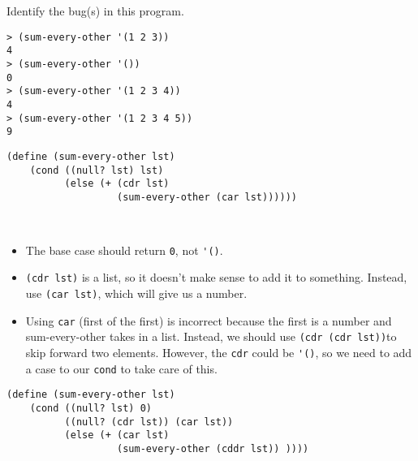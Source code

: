 \begin{blocksection}
\question Identify the bug(s) in this program.

\begin{lstlisting}
> (sum-every-other '(1 2 3))
4
> (sum-every-other '())
0
> (sum-every-other '(1 2 3 4))
4
> (sum-every-other '(1 2 3 4 5))
9
\end{lstlisting}

\begin{lstlisting}
(define (sum-every-other lst)
    (cond ((null? lst) lst)
          (else (+ (cdr lst)
                   (sum-every-other (car lst))))))
                   
 
\end{lstlisting}

\begin{solution}
\begin{itemize}
\item The base case should return \lstinline$0$, not \lstinline$'()$.
\item \lstinline$(cdr lst)$ is a list, so it doesn't make sense to add it to something. 
Instead, use \lstinline$(car lst)$, which will give us a number.
\item Using \lstinline$car$ (first of the first) is incorrect because the first is a
number and sum-every-other takes in a list. Instead, we should use
\lstinline$(cdr (cdr lst))$to skip forward two elements. However, the
\lstinline$cdr$ could be \lstinline$'()$, so we need to add a case to our \lstinline$cond$
to take care of this.
\end{itemize}

\begin{lstlisting}
(define (sum-every-other lst)
    (cond ((null? lst) 0)
          ((null? (cdr lst)) (car lst))
          (else (+ (car lst)
                   (sum-every-other (cddr lst)) ))))
\end{lstlisting}
\end{solution}
\end{blocksection}
